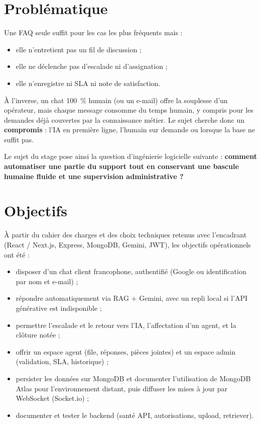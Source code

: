\section{Problématique}

Une FAQ seule suffit pour les cas les plus fréquents mais :

\begin{itemize}[leftmargin=1.4em]
  \item elle n'entretient pas un fil de discussion ;
  \item elle ne déclenche pas d'escalade ni d'assignation ;
  \item elle n'enregistre ni SLA ni note de satisfaction.
\end{itemize}

À l'inverse, un chat 100~\% humain (ou un e-mail) offre la souplesse d'un opérateur, mais chaque message consomme du temps humain, y compris pour les demandes déjà couvertes par la connaissance métier. Le sujet cherche donc un \textbf{compromis} : l'IA en première ligne, l'humain sur demande ou lorsque la base ne suffit pas.

Le sujet du stage pose ainsi la question d'ingénierie logicielle suivante : \textbf{comment automatiser une partie du support tout en conservant une bascule humaine fluide et une supervision administrative ?}

\section{Objectifs}

À partir du cahier des charges et des choix techniques retenus avec l'encadrant (React / Next.js, Express, MongoDB, Gemini, JWT), les objectifs opérationnels ont été :

\begin{itemize}[leftmargin=1.4em]
  \item disposer d'un chat client francophone, authentifié (Google ou identification par nom et e-mail) ;
  \item répondre automatiquement via RAG + Gemini, avec un repli local si l'API générative est indisponible ;
  \item permettre l'escalade et le retour vers l'IA, l'affectation d'un agent, et la clôture notée ;
  \item offrir un espace agent (file, réponses, pièces jointes) et un espace admin (validation, SLA, historique) ;
  \item persister les données sur MongoDB et documenter l'utilisation de MongoDB Atlas pour l'environnement distant, puis diffuser les mises à jour par WebSocket (Socket.io) ;
  \item documenter et tester le backend (santé API, autorisations, upload, retriever).
\end{itemize}

